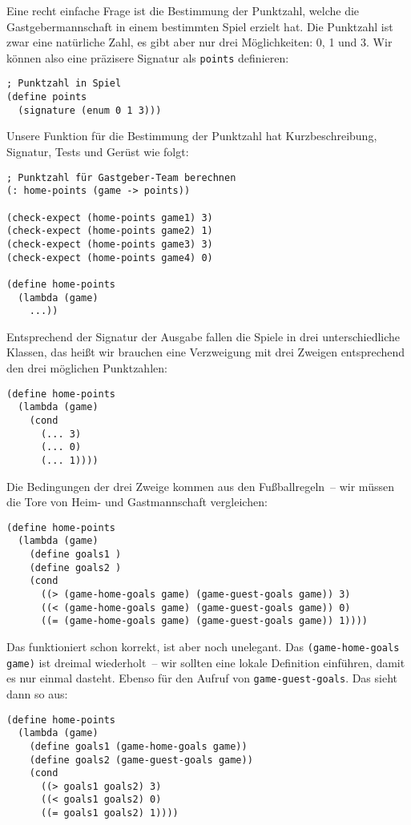 Eine recht einfache Frage ist die Bestimmung der Punktzahl, welche die
Gastgebermannschaft in einem bestimmten Spiel erzielt hat.  Die
Punktzahl ist zwar eine natürliche Zahl, es gibt aber nur drei
Möglichkeiten: 0, 1 und 3.  Wir können also eine präzisere Signatur
als \lstinline{points} definieren:
%
\begin{lstlisting}
; Punktzahl in Spiel
(define points
  (signature (enum 0 1 3)))
\end{lstlisting}
%
Unsere Funktion für die Bestimmung der Punktzahl hat Kurzbeschreibung,
Signatur, Tests und Gerüst wie folgt:
%
\begin{lstlisting}
; Punktzahl für Gastgeber-Team berechnen
(: home-points (game -> points))

(check-expect (home-points game1) 3)
(check-expect (home-points game2) 1)
(check-expect (home-points game3) 3)
(check-expect (home-points game4) 0)

(define home-points
  (lambda (game)
    ...))
\end{lstlisting}
% 
Entsprechend der Signatur der Ausgabe fallen die Spiele in drei
unterschiedliche Klassen, das heißt wir brauchen eine Verzweigung mit
drei Zweigen entsprechend den drei möglichen Punktzahlen:
%
\begin{lstlisting}
(define home-points
  (lambda (game)
    (cond
      (... 3)
      (... 0)
      (... 1))))
\end{lstlisting}
%
Die Bedingungen der drei Zweige kommen aus den Fußballregeln~-- wir
müssen die Tore von Heim- und Gastmannschaft vergleichen:
%
\begin{lstlisting}
(define home-points
  (lambda (game)
    (define goals1 )
    (define goals2 )
    (cond
      ((> (game-home-goals game) (game-guest-goals game)) 3)
      ((< (game-home-goals game) (game-guest-goals game)) 0)
      ((= (game-home-goals game) (game-guest-goals game)) 1))))
\end{lstlisting}
%
Das funktioniert schon korrekt, ist aber noch unelegant.
Das \lstinline{(game-home-goals game)} ist dreimal wiederholt~-- wir
sollten eine lokale Definition einführen, damit es nur einmal
dasteht.  Ebenso für den Aufruf von \lstinline{game-guest-goals}.  Das
sieht dann so aus:
%
\begin{lstlisting}
(define home-points
  (lambda (game)
    (define goals1 (game-home-goals game))
    (define goals2 (game-guest-goals game))
    (cond
      ((> goals1 goals2) 3)
      ((< goals1 goals2) 0)
      ((= goals1 goals2) 1))))
\end{lstlisting}
